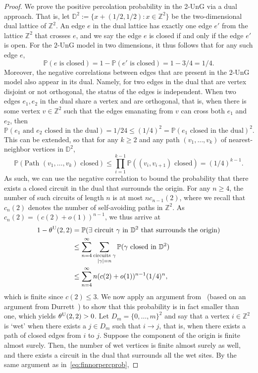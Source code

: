 \documentclass[oneside]{amsart}
\theoremstyle{definition}
\renewcommand{\P}{\mathbb{P}}
\newcommand{\1}{\mathbbm{1}}
\newcommand{\0}{\mathbf{o}}
\newcommand{\Z}{\mathbb{Z}}
\newcommand*{\be}{\begin{equation}}
\newcommand*{\ee}{\end{equation}}
\newcommand*{\ba}{\begin{aligned}}
\newcommand*{\ea}{\end{aligned}}
\newcommand{\D}{\mathbb D}
\numberwithin{equation}{section}
\begin{document}
\begin{proof}
    We prove the positive percolation probability in the 2-UnG via a dual approach. That is, let $\D^2:=\{x+(1/2,1/2): x\in \Z^2\}$ be the two-dimensional dual lattice of $\Z^2$. An edge $e$ in the dual lattice has exactly one edge $e'$ from the lattice $\Z^2$ that crosses $e$, and we say the edge $e$ is closed if and only if the edge $e'$ is open. For the $2$-UnG model in two dimensions, it thus follows that for any such edge $e$, 
    \be 
    \P(e \text{ is closed})=1-\P(e'\text{ is closed})=1-3/4=1/4.
    \ee 
    Moreover, the negative correlations between edges that are present in the $2$-UnG model also appear in its dual. Namely, for two edges in the dual that are vertex disjoint or not orthogonal, the status of the edges is independent. When two edges $e_1,e_2$ in the dual share a vertex and are orthogonal, that is, when there is some vertex $v\in \Z^2$ such that the edges emanating from $v$ can cross both $e_1$ and $e_2$, then
    \be 
    \P(e_1\text{ and }e_2\text{ closed in the dual})=1/24\leq (1/4)^2=\P(e_1\text{ closed in the dual})^2.
    \ee 
    This can be extended, so that for any $k\geq 2$ and any path $(v_1,\ldots, v_k)$ of nearest-neighbor vertices in $\D^2$, 
    \be 
    \P(\text{Path }(v_1,\ldots, v_k)\text{ closed})\leq \prod_{i=1}^{k-1}\P((v_i,v_{i+1})\text{ closed})=(1/4)^{k-1}.
    \ee 
    As such, we can use the negative correlation to bound the probability that there exists a closed circuit in the dual that surrounds the origin. For any $n\geq 4$, the number of such circuits of length $n$ is at most $nc_{n-1}(2)$, where we recall that $c_n(2)$ denotes the number of self-avoiding paths in $\Z^2$. As $c_n(2)=(c(2)+o(1))^{n-1}$, we thus arrive at 
    \be \ba\label{eq:finnorpercprob}
    1-\theta^{\rm U}(2,2)&=\P(\exists \text{ circuit }\gamma \text{ in }\D^2\text{ that surrounds the origin})\\
    &\leq \sum_{n=4}^\infty \sum_{\substack{\text{circuits }\gamma\\ |\gamma|=n}}\P(\gamma\text{ closed in }\D^2)\\
    &\leq \sum_{n=4}^\infty n(c(2)+o(1))^{n-1} (1/4)^n, 
    \ea \ee 
    which is finite since $c(2)\leq 3$. We now apply an argument from~\cite{JanSwart} (based on an argument from Durrett~\cite{Durr88})  to show that this probability is in fact smaller than one, which yields $\theta^{\rm U}(2,2)>0$. Let $D_m=\{0,\ldots, m\}^2$ and say that a vertex $i\in \Z^2$ is `wet' when there exists a $j\in D_m$ such that $i\to j$, that is, when there exists a path of closed edges from $i$ to $j$. Suppose the component of the origin is finite almost surely. Then, the number of wet vertices is finite almost surely as well, and there exists a circuit in the dual that surrounds all the wet sites. By the same argument as in~\eqref{eq:finnorpercprob}, 

\end{proof}
\end{document}
